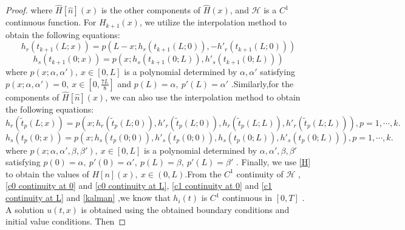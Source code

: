 \documentclass[a4paper,reqno,11pt]{amsart}
\numberwithin{equation}{section} %
\begin{document}
\begin{proof}
where $\hat{H}\left[ \hat{n} \right] \left( x \right)$ is the other components of $\hat{H}(x)$, and $\mathcal{H}$ is a $C^1$ continuous function. For $H_{k+1}\left( x \right) $, we utilize the interpolation method to obtain the following equations:
\begin{equation}\label{polynomial k+1 r}
h_r\left( t_{k+1}\left( L;x \right) \right) =p\left( L-x;h_r\left( t_{k+1}\left( L;0 \right) \right) ,-h'_r\left( t_{k+1}\left( L;0 \right) \right) \right) 
\end{equation}
\begin{equation}\label{polynomial k+1 s}
	h_s\left( t_{k+1}\left( 0;x \right) \right) =p\left( x;h_s\left( t_{k+1}\left( 0;L \right) \right) ,h'_s\left( t_{k+1}\left( 0;L \right) \right) \right) 
\end{equation}
where $p(x;\alpha ,\alpha  ') ,\ x \in [0,L]$ is a polynomial determined by $\alpha ,\alpha  '$ satisfying $p(x;\alpha ,\alpha  ') =0, \  x \in [0,\frac{7L}{8}]$ and $p(L)=\alpha ,\ p'(L)=\alpha  '$ .Similarly,for the components of $\hat{H}\left[ \hat{n} \right] \left( x \right)$, we can also use the interpolation method to obtain the following equations:
\begin{equation}\label{polynomial p r}
	h_r\left( \tilde{t}_p\left( L;x \right) \right) =p\left( x;h_r\left( \tilde{t}_p\left( L;0 \right) \right) ,h'_r\left( \tilde{t}_p\left( L;0 \right) \right) ,h_r\left( \tilde{t}_p\left( L;L \right) \right) ,h'_r\left( \tilde{t}_p\left( L;L \right) \right) \right) ,p=1,\cdots,k.
\end{equation}
\begin{equation}\label{polynomial p s}
	h_s\left( t_p\left( 0;x \right) \right) =p\left( x;h_s\left( t_p\left( 0;0 \right) \right) ,h'_s\left( t_p\left( 0;0 \right) \right) ,h_s\left( t_p\left( 0;L \right) \right) ,h'_s\left( t_p\left( 0;L \right) \right) \right) ,p=1,\cdots,k.
\end{equation}
where $p(x;\alpha ,\alpha  ',\beta ,\beta  ') ,\ x \in [0,L]$ is a polynomial determined by $\alpha ,\alpha  ',\beta ,\beta  '$ satisfying $p(0)=\alpha ,\ p'(0)=\alpha  ',\ p(L)=\beta ,\ p'(L)=\beta  '$ . Finally, we use \eqref{H} to obtain the values of $H\left[ n \right] \left( x \right),\  x \in (0,L)$.From the $C^1$ continuity of $\mathcal{H}$ , \eqref{c0 continuity at 0} and \eqref{c0 continuity at L}, \eqref{c1 continuity at 0} and \eqref{c1 continuity at L} and \eqref{kalman} ,we know that $h_i(t)$ is $C^1$ continuous in $[0,T]$ .
A solution $u(t,x)$ is obtained using the obtained boundary conditions and initial value conditions. Then

\end{proof}
\end{document}
